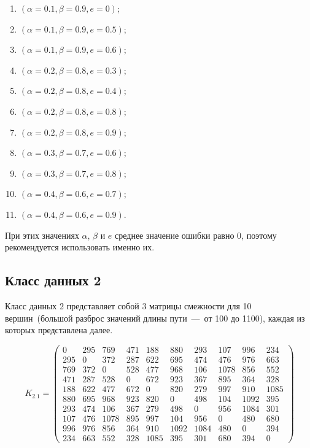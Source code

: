 \begin{enumerate}[label=---]
	\item $(\alpha = 0.1, \beta = 0.9, e = 0)$;
	\item $(\alpha = 0.1, \beta = 0.9, e = 0.5)$;
	\item $(\alpha = 0.1, \beta = 0.9, e = 0.6)$; 
	\item $(\alpha = 0.2, \beta = 0.8, e = 0.3)$; 
	\item $(\alpha = 0.2, \beta = 0.8, e = 0.4)$; 
	\item $(\alpha = 0.2, \beta = 0.8, e = 0.8)$; 
	\item $(\alpha = 0.2, \beta = 0.8, e = 0.9)$; 
	\item $(\alpha = 0.3, \beta = 0.7, e = 0.6)$;
	\item $(\alpha = 0.3, \beta = 0.7, e = 0.8)$; 
	\item $(\alpha = 0.4, \beta = 0.6, e = 0.7)$; 
	\item $(\alpha = 0.4, \beta = 0.6, e = 0.9)$.
\end{enumerate}

При этих значениях $\alpha$, $\beta$ и $e$ среднее значение ошибки равно 0, поэтому рекомендуется использовать именно их.

\subsection{Класс данных 2}\label{par:class2}

Класс данных 2 представляет собой 3 матрицы смежности для 10 вершин~(большой разброс значений длины пути~---~от 100 до 1100), каждая из которых представлена далее.



\begin{equation}
	\label{eq:kd2.1}
	K_{2.1} = \begin{pmatrix}
	0 & 295 & 769 & 471 & 188 & 880 & 293 & 107 & 996 & 234 \\ 
	295 & 0 & 372 & 287 & 622 & 695 & 474 & 476 & 976 & 663 \\ 
	769 & 372 & 0 & 528 & 477 & 968 & 106 & 1078 & 856 & 552 \\ 
	471 & 287 & 528 & 0 & 672 & 923 & 367 & 895 & 364 & 328 \\ 
	188 & 622 & 477 & 672 & 0 & 820 & 279 & 997 & 910 & 1085 \\ 
	880 & 695 & 968 & 923 & 820 & 0 & 498 & 104 & 1092 & 395 \\ 
	293 & 474 & 106 & 367 & 279 & 498 & 0 & 956 & 1084 & 301 \\ 
	107 & 476 & 1078 & 895 & 997 & 104 & 956 & 0 & 480 & 680 \\ 
	996 & 976 & 856 & 364 & 910 & 1092 & 1084 & 480 & 0 & 394 \\ 
	234 & 663 & 552 & 328 & 1085 & 395 & 301 & 680 & 394 & 0  
	\end{pmatrix}
\end{equation}

